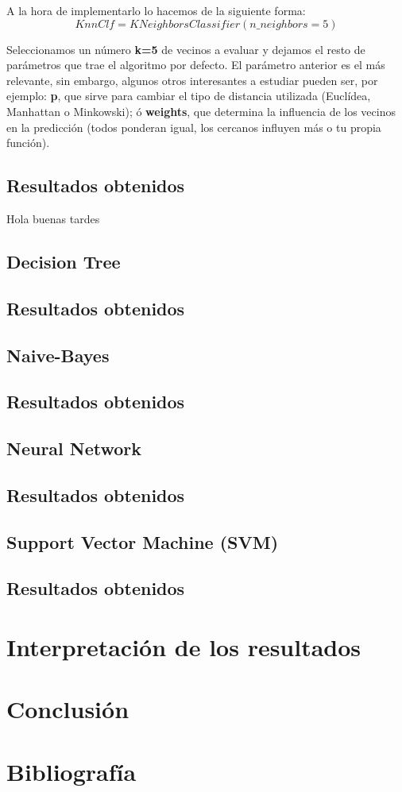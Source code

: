 \documentclass[11pt,a4paper]{article}
\begin{document}
\newpage
A la hora de implementarlo lo hacemos de la siguiente forma:
$$KnnClf = KNeighborsClassifier(n\_neighbors=5)$$

Seleccionamos un número \textbf{k=5} de vecinos a evaluar y dejamos el resto de parámetros que trae el algoritmo por defecto.
El parámetro anterior es el más relevante, sin embargo, algunos otros interesantes a estudiar pueden ser, por ejemplo:
\textbf{p}, que sirve para cambiar el tipo de distancia utilizada (Euclídea, Manhattan o Minkowski); ó \textbf{weights}, que
determina la influencia de los vecinos en la predicción (todos ponderan igual, los cercanos influyen más o tu propia función).


\subsection*{Resultados obtenidos}
Hola buenas tardes


\subsection{Decision Tree}

\subsection*{Resultados obtenidos}


\subsection{Naive-Bayes}

\subsection*{Resultados obtenidos}


\subsection{Neural Network}

\subsection*{Resultados obtenidos}


\subsection{Support Vector Machine (SVM)}

\subsection*{Resultados obtenidos}


\section{Interpretación de los resultados}


\section{Conclusión}


\section{Bibliografía}
\end{document}
